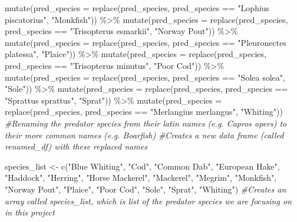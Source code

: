 \documentclass[
]{article}
\newenvironment{Shaded}{\begin{snugshade}}{\end{snugshade}}
\newcommand{\AttributeTok}[1]{\textcolor[rgb]{0.77,0.63,0.00}{#1}}
\newcommand{\CommentTok}[1]{\textcolor[rgb]{0.56,0.35,0.01}{\textit{#1}}}
\newcommand{\FunctionTok}[1]{\textcolor[rgb]{0.00,0.00,0.00}{#1}}
\newcommand{\NormalTok}[1]{#1}
\newcommand{\OtherTok}[1]{\textcolor[rgb]{0.56,0.35,0.01}{#1}}
\newcommand{\SpecialCharTok}[1]{\textcolor[rgb]{0.00,0.00,0.00}{#1}}
\newcommand{\StringTok}[1]{\textcolor[rgb]{0.31,0.60,0.02}{#1}}
\begin{document}
\begin{Shaded}
\begin{Highlighting}[]
  \FunctionTok{mutate}\NormalTok{(}\AttributeTok{pred\_species =} \FunctionTok{replace}\NormalTok{(pred\_species, pred\_species }\SpecialCharTok{==} \StringTok{"Lophius piscatorius"}\NormalTok{, }\StringTok{"Monkfish"}\NormalTok{)) }\SpecialCharTok{\%\textgreater{}\%} 
  \FunctionTok{mutate}\NormalTok{(}\AttributeTok{pred\_species =} \FunctionTok{replace}\NormalTok{(pred\_species, pred\_species }\SpecialCharTok{==} \StringTok{"Trisopterus esmarkii"}\NormalTok{, }\StringTok{"Norway Pout"}\NormalTok{)) }\SpecialCharTok{\%\textgreater{}\%}  
  \FunctionTok{mutate}\NormalTok{(}\AttributeTok{pred\_species =} \FunctionTok{replace}\NormalTok{(pred\_species, pred\_species }\SpecialCharTok{==} \StringTok{"Pleuronectes platessa"}\NormalTok{, }\StringTok{"Plaice"}\NormalTok{)) }\SpecialCharTok{\%\textgreater{}\%}
  \FunctionTok{mutate}\NormalTok{(}\AttributeTok{pred\_species =} \FunctionTok{replace}\NormalTok{(pred\_species, pred\_species }\SpecialCharTok{==} \StringTok{"Trisopterus minutus"}\NormalTok{, }\StringTok{"Poor Cod"}\NormalTok{)) }\SpecialCharTok{\%\textgreater{}\%}  
  \FunctionTok{mutate}\NormalTok{(}\AttributeTok{pred\_species =} \FunctionTok{replace}\NormalTok{(pred\_species, pred\_species }\SpecialCharTok{==} \StringTok{"Solea solea"}\NormalTok{, }\StringTok{"Sole"}\NormalTok{)) }\SpecialCharTok{\%\textgreater{}\%} 
  \FunctionTok{mutate}\NormalTok{(}\AttributeTok{pred\_species =} \FunctionTok{replace}\NormalTok{(pred\_species, pred\_species }\SpecialCharTok{==} \StringTok{"Sprattus sprattus"}\NormalTok{, }\StringTok{"Sprat"}\NormalTok{)) }\SpecialCharTok{\%\textgreater{}\%}
  \FunctionTok{mutate}\NormalTok{(}\AttributeTok{pred\_species =} \FunctionTok{replace}\NormalTok{(pred\_species, pred\_species }\SpecialCharTok{==} \StringTok{"Merlangius merlangus"}\NormalTok{, }\StringTok{"Whiting"}\NormalTok{))}
\CommentTok{\#Renaming the predator species from their latin names (e.g. Capros apers) to their more common names (e.g. Boarfish)}
\CommentTok{\#Creates a new data frame (called \textquotesingle{}renamed\_df\textquotesingle{}) with these replaced names}

\NormalTok{species\_list }\OtherTok{\textless{}{-}} \FunctionTok{c}\NormalTok{(}\StringTok{"Blue Whiting"}\NormalTok{, }\StringTok{"Cod"}\NormalTok{, }\StringTok{"Common Dab"}\NormalTok{, }\StringTok{"European Hake"}\NormalTok{, }\StringTok{"Haddock"}\NormalTok{, }\StringTok{"Herring"}\NormalTok{,}
                     \StringTok{"Horse Mackerel"}\NormalTok{, }\StringTok{"Mackerel"}\NormalTok{, }\StringTok{"Megrim"}\NormalTok{, }\StringTok{"Monkfish"}\NormalTok{, }\StringTok{"Norway Pout"}\NormalTok{,  }\StringTok{"Plaice"}\NormalTok{,}
                     \StringTok{"Poor Cod"}\NormalTok{, }\StringTok{"Sole"}\NormalTok{, }\StringTok{"Sprat"}\NormalTok{, }\StringTok{"Whiting"}\NormalTok{)}
\CommentTok{\#Creates an array called \textquotesingle{}species\_list\textquotesingle{}, which is list of the predator species we are focusing on in this project}


\end{Highlighting}
\end{Shaded}
\end{document}
